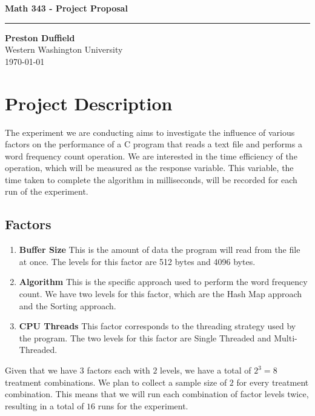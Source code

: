 \documentclass{article}
\begin{document}
\noindent
\begin{minipage}[t]{0.6\textwidth}
    \begin{flushleft}
        \LARGE\textbf{Math 343 - Project Proposal} \\
        \vspace{6pt} %
        \hrule width 10cm
        \vspace{12pt}
        \large\textbf{Preston Duffield} \\
        \large Western Washington University \\
        \today
        \vspace{24pt}
    \end{flushleft}
\end{minipage}

\section*{Project Description}

The experiment we are conducting aims to investigate the influence
of various factors on the performance of a C program that reads a
text file and performs a word frequency count operation. We are interested
in the time efficiency of the operation, which will be measured as the
response variable. This variable, the time taken to complete the algorithm
in milliseconds, will be recorded for each run of the experiment.

\subsection*{Factors}
\begin{enumerate}
  \item \textbf{Buffer Size} This is the amount of data the program will read from the file at once. The levels for this factor are 512 bytes and 4096 bytes.
  \item \textbf{Algorithm} This is the specific approach used to perform the word frequency count. We have two levels for this factor, which are the Hash Map approach and the Sorting approach.
  \item \textbf{CPU Threads} This factor corresponds to the threading strategy used by the program. The two levels for this factor are Single Threaded and Multi-Threaded.
\end{enumerate}

Given that we have $3$ factors each with $2$ levels,
we have a total of $2^3 = 8$ treatment combinations.
We plan to collect a sample size of $2$ for every treatment combination.
This means that we will run each combination of factor levels twice,
resulting in a total of $16$ runs for the experiment.
\end{document}
